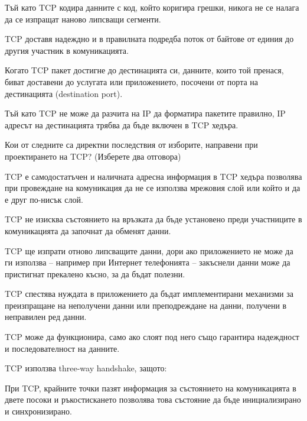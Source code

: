 \begin{questions}
\begin{choices}
    \choice Тъй като \foreignlanguage{english}{TCP} кодира данните с код, който
    коригира грешки, никога не се налага да се изпращат наново липсващи
    сегменти.

    \CorrectChoice \foreignlanguage{english}{TCP} доставя надеждно и в
    правилната подредба поток от байтове от единия до другия участник в
    комуникацията.

    \CorrectChoice Когато \foreignlanguage{english}{TCP} пакет достигне до
    дестинацията си, данните, които той пренася, биват доставени до услугата или
    приложението, посочени от порта на дестинацията
    (\foreignlanguage{english}{destination port}).

    \choice Тъй като \foreignlanguage{english}{TCP} не може да разчита на
    IP да форматира пакетите правилно, IP адресът на дестинацията трябва да бъде
    включен в TCP хедъра.
  \end{choices}

  \question[6] Кои от следните са директни последствия от изборите, направени
  при проектирането на TCP? (Изберете два отговора)
  \begin{choices}
    \choice TCP е самодостатъчен и наличната адресна информация в TCP хедъра
    позволява при провеждане на комуникация да не се използва мрежовия слой или
    който и да е друг по-нисък слой.

    \choice TCP не изисква състоянието на връзката да бъде установено преди
    участниците в комуникацията да започнат да обменят данни.

    \CorrectChoice TCP ще изпрати отново липсващите данни, дори ако приложението
    не може да ги използва -- например при Интернет телефонията -- закъснели
    данни може да пристигнат прекалено късно, за да бъдат полезни.

    \CorrectChoice TCP спестява нуждата в приложението да бъдат имплементирани
    механизми за преизпращане на неполучени данни или преподреждане на данни,
    получени в неправилен ред данни.

    \choice TCP може да функционира, само ако слоят под него също гарантира
    надеждност и последователност на данните.
  \end{choices}

  \question[6] TCP използва three-way handshake, защото:
  \begin{choices}

    \CorrectChoice При TCP, крайните точки пазят информация за състоянието на
    комуникацията в двете посоки и ръкостискането позволява това състояние да
    бъде инициализирано и синхронизирано.


\end{choices}
\end{questions}
